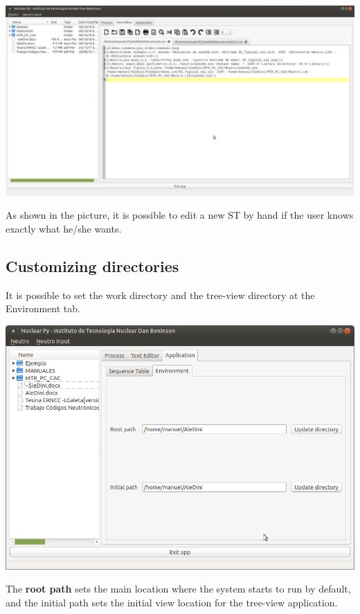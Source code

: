 \documentclass[a4paper,10pt]{article}
\begin{document}
\begin{center}
 \includegraphics[width=\textwidth]{img/tablaDeSecuenciasConfig.png}
\end{center}

As shown in the picture, it is possible to edit a new ST by hand if the user knows exactly what he/she wants.

\subsection{Customizing directories}

It is possible to set the work directory and the tree-view directory at the Environment tab.

 \begin{center}
 \includegraphics[width=\textwidth]{img/environment.png}
\end{center}

The \textbf{root path} sets the main location where the system starts to run by default, and the initial path sets the initial view location for the tree-view application.
\end{document}
